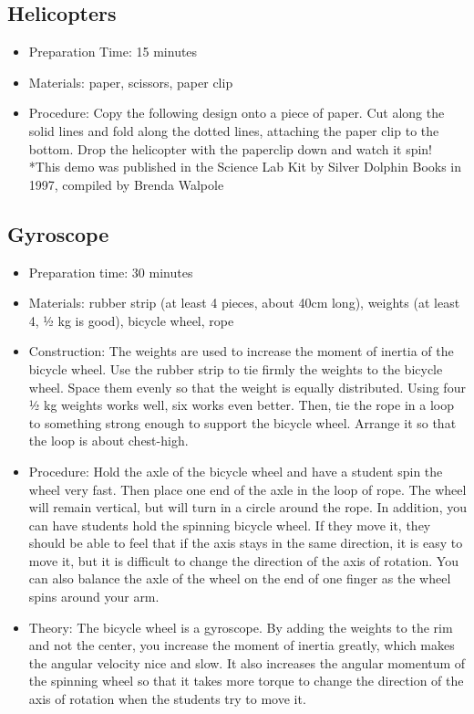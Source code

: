 \subsection{Helicopters}
\begin{itemize}
\item{Preparation Time: 15 minutes}
\item{Materials: paper, scissors, paper clip}
\item{Procedure: Copy the following design onto a piece of paper. Cut along the solid lines and fold along the dotted lines, attaching the paper clip to the bottom. Drop the helicopter with the paperclip down and watch it spin!
*This demo was published in the Science Lab Kit by Silver Dolphin Books in 1997, compiled by Brenda Walpole}
\end{itemize}

\subsection{Gyroscope}
\begin{itemize}
\item{Preparation time: 30 minutes}
\item{Materials: rubber strip (at least 4 pieces, about 40cm long), weights (at least 4, ½ kg is good), bicycle wheel, rope}
\item{Construction: The weights are used to increase the moment of inertia of the bicycle wheel. Use the rubber strip to tie firmly the weights to the bicycle wheel. Space them evenly so that the weight is equally distributed. Using four ½ kg weights works well, six works even better. Then, tie the rope in a loop to something strong enough to support the bicycle wheel. Arrange it so that the loop is about chest-high.}
\item{Procedure: Hold the axle of the bicycle wheel and have a student spin the wheel very fast. Then place one end of the axle in the loop of rope. The wheel will remain vertical, but will turn in a circle around the rope. In addition, you can have students hold the spinning bicycle wheel. If they move it, they should be able to feel that if the axis stays in the same direction, it is easy to move it, but it is difficult to change the direction of the axis of rotation. You can also balance the axle of the wheel on the end of one finger as the wheel spins around your arm.}
\item{Theory: The bicycle wheel is a gyroscope. By adding the weights to the rim and not the center, you increase the moment of inertia greatly, which makes the angular velocity nice and slow. It also increases the angular momentum of the spinning wheel so that it takes more torque to change the direction of the axis of rotation when the students try to move it.}
\end{itemize}

